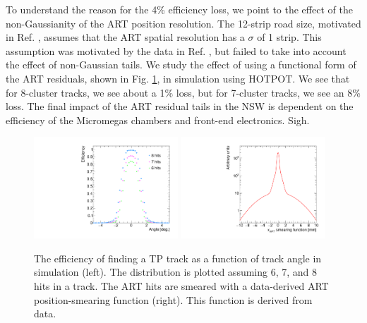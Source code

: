 \par To understand the reason for the 4\% efficiency loss, we point to the effect of the non-Gaussianity of the ART position resolution. The 12-strip road size, motivated in Ref. \cite{tpsim}, assumes that the ART spatial resolution has a $\sigma$ of 1 strip. This assumption was motivated by the data in Ref. \cite{mmtp}, but failed to take into account the effect of non-Gaussian tails. We study the effect of using a functional form of the ART residuals, shown in Fig. \ref{fig:smear}, in simulation using HOTPOT. We see that for 8-cluster tracks, we see about a 1\% loss, but for 7-cluster tracks, we see an 8\% loss. The final impact of the ART residual tails in the NSW is dependent on the efficiency of the Micromegas chambers and front-end electronics. Sigh.
\begin{figure}[!htpb]
  \begin{center}
    \includegraphics[width=0.48\textwidth]{figures/sim_eff_nhits_lin.pdf}
    \includegraphics[width=0.48\textwidth]{figures/smear.pdf}
  \end{center}
  \vspace{-10pt}
  \caption{The efficiency of finding a TP track as a function of track angle in simulation (left). The distribution is plotted assuming 6, 7, and 8 hits in a track. The ART hits are smeared with a data-derived ART position-smearing function (right). This function is derived from data.}
  \label{fig:smear}
\end{figure}
